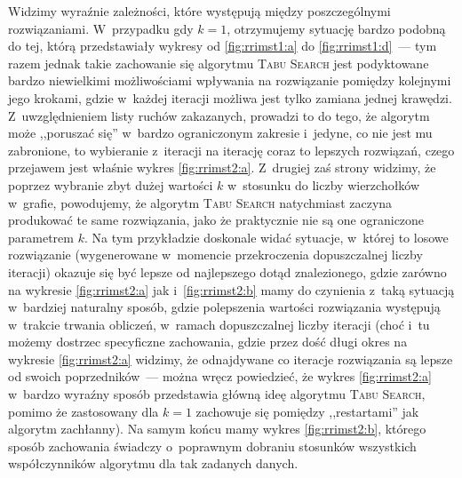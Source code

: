 Widzimy wyraźnie zależności, które występują między poszczególnymi rozwiązaniami.
W~przypadku gdy $k = 1$, otrzymujemy sytuację bardzo podobną do tej, którą przedstawiały wykresy od \ref{fig:rrimst1:a} do \ref{fig:rrimst1:d}~--- tym razem jednak takie zachowanie się algorytmu \textsc{Tabu Search} jest podyktowane bardzo niewielkimi możliwościami wpływania na rozwiązanie pomiędzy kolejnymi jego krokami, gdzie w~każdej iteracji możliwa jest tylko zamiana jednej krawędzi.
Z~uwzględnieniem listy ruchów zakazanych, prowadzi to do tego, że algorytm może ,,poruszać się'' w~bardzo ograniczonym zakresie i~jedyne, co nie jest mu zabronione, to wybieranie z~iteracji na iterację coraz to lepszych rozwiązań, czego przejawem jest właśnie wykres \ref{fig:rrimst2:a}.
Z~drugiej zaś strony widzimy, że poprzez wybranie zbyt dużej wartości $k$ w~stosunku do liczby wierzchołków w~grafie, powodujemy, że algorytm \textsc{Tabu Search} natychmiast zaczyna produkować te same rozwiązania, jako że praktycznie nie są one ograniczone parametrem $k$.
Na tym przykładzie doskonale widać sytuacje, w~której to losowe rozwiązanie (wygenerowane w~momencie przekroczenia dopuszczalnej liczby iteracji) okazuje się być lepsze od najlepszego dotąd znalezionego, gdzie zarówno na wykresie \ref{fig:rrimst2:a} jak i~\ref{fig:rrimst2:b} mamy do czynienia z~taką sytuacją w~bardziej naturalny sposób, gdzie polepszenia wartości rozwiązania występują w~trakcie trwania obliczeń, w~ramach dopuszczalnej liczby iteracji (choć i~tu możemy dostrzec specyficzne zachowania, gdzie przez dość długi okres na wykresie \ref{fig:rrimst2:a} widzimy, że odnajdywane co iteracje rozwiązania są lepsze od swoich poprzedników~--- można wręcz powiedzieć, że wykres \ref{fig:rrimst2:a} w~bardzo wyraźny sposób przedstawia główną ideę algorytmu \textsc{Tabu Search}, pomimo że zastosowany dla $k = 1$ zachowuje się pomiędzy ,,restartami'' jak algorytm zachłanny).
Na samym końcu mamy wykres \ref{fig:rrimst2:b}, którego sposób zachowania świadczy o~poprawnym dobraniu stosunków wszystkich współczynników algorytmu dla tak zadanych danych. 

